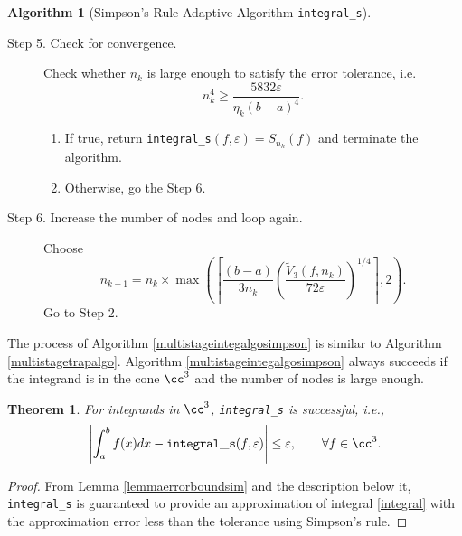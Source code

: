 \documentclass{iitthesis}
\newtheorem{theorem}{Theorem}
\theoremstyle{definition}
\newtheorem{algo}{Algorithm}
\theoremstyle{remark}
\begin{document}
\begin{algo} [Simpson's Rule Adaptive Algorithm {\tt integral\_s}]
\begin{description}
\item[Step 5. Check for convergence.] Check whether $n_k$ is large enough to satisfy the error tolerance, i.e.
    \begin{equation*}
          n_k^4 \ge \frac{5832\varepsilon}{\eta_{k}(b-a)^4}.
    \end{equation*}

    \begin{enumerate}[label=\alph*)]
      \item If true, return {\tt integral\_s}$(f,\varepsilon)=S_{n_k}(f)$ and terminate the algorithm.
      \item Otherwise, go the Step 6.
    \end{enumerate}


\item[Step 6. Increase the number of nodes and loop again.] Choose
$$
n_{k+1}=n_k\times\max\left(\left\lceil\frac{(b-a)}{3n_{k}}\left(\frac{\widetilde{V}_3(f,n_k)}{72\varepsilon}\right)^{1/4}\right\rceil,2\right).
$$
Go to Step 2.
\end{description}
\end{algo}

The process of Algorithm \ref{multistageintegalgosimpson} is similar to Algorithm \ref{multistagetrapalgo}. Algorithm \ref{multistageintegalgosimpson} always succeeds if the integrand is in the cone $\cc^3$ and the number of nodes is large enough.
\begin{theorem}\label{thmSimpson}
    For integrands in $\cc^3$, {\tt integral\_s} is successful, i.e.,
    \begin{equation*}
      \left|\int_{a}^{b}f(x)dx-{\tt integral\_s}(f,\varepsilon)\right|\le\varepsilon, \qquad \forall f\in \cc^3.
    \end{equation*}
\end{theorem}
\begin{proof}
 From Lemma \ref{lemmaerrorboundsim} and the description below it, {\tt integral\_s} is guaranteed to provide an approximation of integral \eqref{integral} with the approximation error less than the tolerance using Simpson's rule.
\end{proof}
\end{document}
